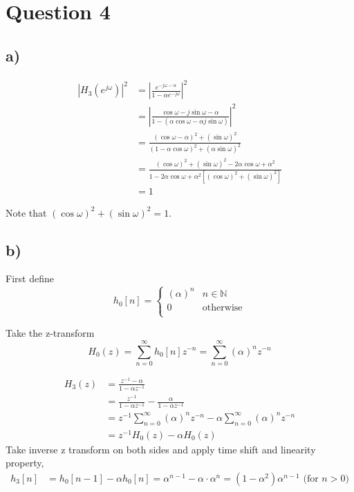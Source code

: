 \documentclass{article}
\newenvironment{homeworkProblem}[1]{
	\section*{#1}
	}{
}
\newenvironment{homeworkSection}[1]{
	\subsection*{#1}
	}{
}
\begin{document}
\begin{homeworkProblem}{Question 4}

\begin{homeworkSection}{a)}

\begin{align*}
|H_3(e^{j\omega})|^2 &=|\frac{e^{-j\omega-\alpha}}{1-\alpha e^{-j\omega}}|^2\\
&=|\frac{\cos\omega-j\sin\omega-\alpha}{1-(\alpha\cos\omega-\alpha j \sin\omega)}|^2\\
&= \frac{(\cos\omega - \alpha)^2 + (\sin\omega)^2}{(1 - \alpha\cos\omega)^2 + (\alpha\sin\omega)^2}\\
&= \frac{(\cos\omega)^2 + (\sin\omega)^2 - 2\alpha\cos\omega + \alpha^2}{1 - 2\alpha\cos\omega + \alpha^2[(\cos\omega)^2+(\sin\omega)^2]}\\
&= 1
\end{align*}

Note that $(\cos\omega)^2 + (\sin\omega)^2 = 1$.

\end{homeworkSection}

\begin{homeworkSection}{b)}

First define
\begin{equation}\label{A4a}
h_0[n] = \begin{cases} (\alpha)^n & n \in \mathbb{N} \\ 0 & \text{otherwise}\\ \end{cases}
\end{equation}

Take the z-transform
\begin{equation}\label{A4b}
H_0(z)=\sum_{n=0}^{\infty}h_0[n] z^{-n}=\sum_{n=0}^{\infty}(\alpha)^n z^{-n}
\end{equation}

\begin{align*}
H_3(z)&=\frac{z^{-1}-\alpha}{1-\alpha z^{-1}}\\
&=\frac{z^{-1}}{1-\alpha z^{-1}}-\frac{\alpha}{1-\alpha z^{-1}}\\
&=z^{-1}\sum_{n=0}^{\infty}(\alpha)^n z^{-n}-\alpha\sum_{n=0}^{\infty}(\alpha)^n z^{-n}\\
&=z^{-1} H_0(z) - \alpha H_0(z)
\end{align*}
Take inverse z transform on both sides and apply time shift and linearity property,
\begin{align*}
h_3[n] &= h_0[n-1] - \alpha h_0[n] = \alpha^{n-1} - \alpha \cdot \alpha^n = (1-\alpha^2) \alpha^{n-1} \text{ (for $n>0$)}
\end{align*}


\end{homeworkSection}
\end{homeworkProblem}
\end{document}
